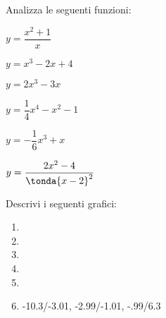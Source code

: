 \begin{esercizio}\label{ese:stufun.1e}
Analizza le seguenti funzioni:
\begin{multicols}{3}
 \begin{enumeratea}
  \item \(y = \dfrac{x^2 +1}{x}\) \\ %
  \item \(y = x^3-2x+4\) %
  \item \(y = 2x^3-3x\) \\ %
  \item \(y = \dfrac{1}{4}x^4-x^2-1\) %
  \item \(y = -\dfrac{1}{6}x^3+x\) \\ %
  \item \(y = \dfrac{2x^2-4}{\tonda{x-2}^2}\) %
 \end{enumeratea}
\end{multicols}
\end{esercizio}


\begin{esercizio}\label{ese:stufun.2g}
Descrivi i seguenti grafici:

\begin{multicols}{2}
\begin{enumerate} [left=0pt, label=\alph*)]
\item \myp 
{} %
\item \myp 
{}%
\item \myp 
{}%
\item \myp 
{} %
\item \myp 
{} %
\item \myp 
{} 
{-10.3/-3.01, -2.99/-1.01, -.99/6.3}%
\end{enumerate}
\end{multicols}
\end{esercizio}

